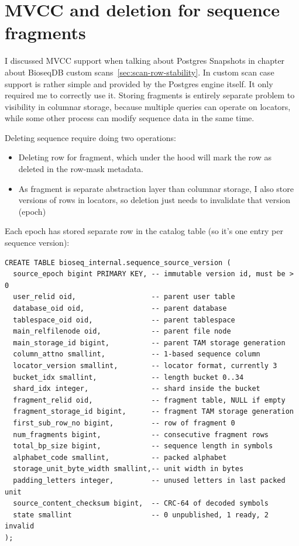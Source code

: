 \section{MVCC and deletion for sequence fragments}
\label{sec:pg-storage-versions}

I discussed MVCC support when talking about Postgres Snapshots in chapter about BioseqDB custom scans~\ref{sec:scan-row-stability}.
In custom scan case support is rather simple and provided by the Postgres engine itself. It only required me to correctly use it.
Storing fragments is entirely separate problem to visibility in columnar storage, because multiple queries can operate on locators, while some other process can 
modify sequence data in the same time. 

Deleting sequence require doing two operations:
\begin{itemize}
  \item Deleting row for fragment, which under the hood will mark the row as deleted in the row-mask metadata. 
  \item As fragment is separate abstraction layer than columnar storage, I also store versions of rows in locators, so deletion just needs to invalidate that version (epoch)
\end{itemize}

Each epoch has stored separate row in the catalog table (so it's one entry per sequence version):
\noindent\begin{minipage}{\linewidth}
\begin{lstlisting}[style=bioseq-storage-sql,
  basicstyle=\footnotesize\ttfamily,
  breaklines=true,breakatwhitespace=true,
  caption={Heap catalog for one immutable sequence version. Invalidation updates \texttt{state}.},
  label={lst:storage-source-version}]
CREATE TABLE bioseq_internal.sequence_source_version (
  source_epoch bigint PRIMARY KEY, -- immutable version id, must be > 0
  user_relid oid,                  -- parent user table
  database_oid oid,                -- parent database
  tablespace_oid oid,              -- parent tablespace
  main_relfilenode oid,            -- parent file node
  main_storage_id bigint,          -- parent TAM storage generation
  column_attno smallint,           -- 1-based sequence column
  locator_version smallint,        -- locator format, currently 3
  bucket_idx smallint,             -- length bucket 0..34
  shard_idx integer,               -- shard inside the bucket
  fragment_relid oid,              -- fragment table, NULL if empty
  fragment_storage_id bigint,      -- fragment TAM storage generation
  first_sub_row_no bigint,         -- row of fragment 0
  num_fragments bigint,            -- consecutive fragment rows
  total_bp_size bigint,            -- sequence length in symbols
  alphabet_code smallint,          -- packed alphabet
  storage_unit_byte_width smallint,-- unit width in bytes
  padding_letters integer,         -- unused letters in last packed unit
  source_content_checksum bigint,  -- CRC-64 of decoded symbols
  state smallint                   -- 0 unpublished, 1 ready, 2 invalid
);
\end{lstlisting}
\end{minipage}

